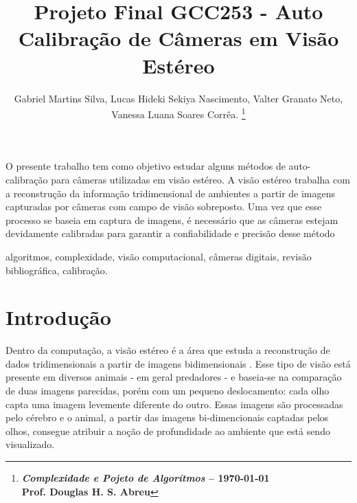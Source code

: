 \documentclass[portuguese]{sbrt}
\begin{document}
 
  
\title{Projeto Final GCC253 - Auto Calibração de Câmeras em Visão Estéreo} 
  
\author{Gabriel Martins Silva, Lucas Hideki Sekiya Nascimento, Valter Granato Neto, Vanessa Luana Soares Corrêa. 
\thanks{\centering \textbf{\textit{Complexidade e Pojeto de Algorítmos} -- \today \\ Prof. Douglas H. S. Abreu}}%
} 
  
\maketitle 

  
  
  
  
\begin{resumo} 
O presente trabalho tem como objetivo estudar alguns métodos de auto-calibração para câmeras utilizadas em visão estéreo. A visão estéreo trabalha com a reconstrução da informação tridimensional de ambientes a partir de imagens capturadas por câmeras com campo de visão sobreposto. Uma vez que esse processo se baseia em captura de imagens, é necessário que as câmeras estejam devidamente calibradas para garantir a confiabilidade e precisão desse método
\end{resumo} 
\begin{chave} 
algoritmos, complexidade, visão computacional, câmeras digitais, revisão bibliográfica, calibração. 
\end{chave} 
  

  
  

\section{Introdução} 
\label{sec:introducao} 
  
Dentro da computação, a visão estéreo é a área que estuda a reconstrução de dados tridimensionais a partir de imagens bidimensionais \cite{MadalenaMenotti:2020}. Esse tipo de visão está presente em diversos animais - em geral predadores - e baseia-se na comparação de duas imagens parecidas, porém com um pequeno deslocamento: cada olho capta uma imagem levemente diferente do outro. Essas imagens são processadas pelo cérebro e o animal, a partir das imagens bi-dimencionais captadas pelos olhos, consegue atribuir a noção de profundidade ao ambiente que está sendo visualizado.
\end{document}
